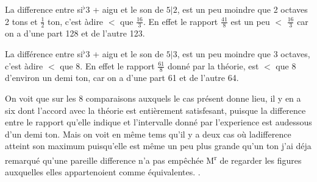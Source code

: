 \documentclass[11pt,a4paper]{article}
\begin{document}
La difference entre si$^{\flat}$3 + aigu et le son de $5|2$, est
un peu moindre que 2 octaves 2 tons et $\frac{1}{2}$ ton, c'est àdire
$<$ que $\frac{16}{3}$. En effet le rapport $\frac{41}{8}$ est un peu $<$ $\frac{16}{3}$
car on a d'une part 128 et de l'autre 123.


La différence entre si$^{\flat}$3 + aigu et le son de $5|3$, est un peu moindre
que 3 octaves, c'est àdire $<$ que 8. En effet le rapport $\frac{61}{8}$
 donné par la théorie, est $<$ que 8 d'environ un demi
ton, car on a d'une part 61 et de l'autre 64.

On voit que sur les 8 comparaisons auxquels le cas présent donne
lieu, il y en a six dont l'accord avec la théorie est entièrement
satisfesant, puisque la difference entre le rapport qu'elle
indique et l'intervalle donné par l'experience est audessous
d'un demi ton. Mais on voit en même tems qu'il y a
deux cas où ladifference atteint son maximum puisqu'elle
est même un peu plus grande qu'un ton  j'ai déja
remarqué qu'une pareille difference n'a pas empêchée
M\textsuperscript{r}  de regarder les figures auxquelles elles
appartenoient comme équivalentes. .
\end{document}
